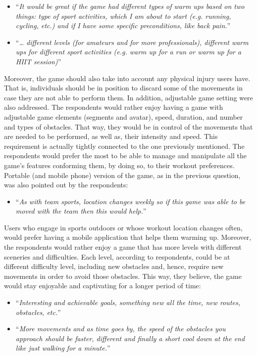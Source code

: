 \begin{itemize}
\item ``\textit{It would be great if the game had different types of warm ups based on two things:  type of sport activities, which I am about to start (e.g. running, cycling, etc.) and if I have some specific preconditions, like back pain.}''
\item ``\textit{… different levels (for amateurs and for more professionals), different warm ups for different sport activities (e.g. warm up for a run or warm up for a HIIT session)}''
\end{itemize}
Moreover, the game should also take into account any physical injury users have. That is, individuals should be in position to discard some of the movements in case they are not able to perform them. In addition, adjustable game setting were also addressed. The respondents would rather enjoy having a game with adjustable game elements (segments and avatar), speed, duration, and number and types of obstacles. That way, they would be in control of the movements that are needed to be performed, as well as, their intensity and speed. This requirement is actually tightly connected to the one previously mentioned. The respondents would prefer the most to be able to manage and manipulate all the game's features conforming them, by doing so, to their workout preferences. Portable (and mobile phone) version of the game, as in the previous question, was also pointed out by the respondents:
\begin{itemize}
\item ``\textit{As with team sports, location changes weekly so if this game was able to be moved with the team then this would help.}''
\end{itemize} 
Users who engage in sports outdoors or whose workout location changes often, would prefer having a mobile application that helps them warming up. Moreover, the respondents would rather enjoy a game that has more levels with different sceneries and difficulties. Each level, according to respondents, could be at different difficulty level, including new obstacles and, hence, require new movements in order to avoid those obstacles. This way, they believe, the game would stay enjoyable and captivating for a longer period of time:
\begin{itemize}
\item ``\textit{Interesting and achievable goals, something new all the time, new routes, obstacles, etc.}''
\item ``\textit{More movements and as time goes by, the speed of the obstacles you approach should be faster, different and finally a short cool down at the end like just walking for a minute.}''
\end{itemize}
